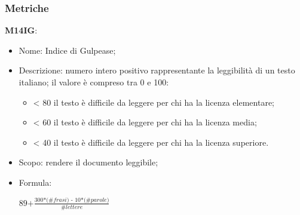 \subsubsection{Metriche}
\textbf{M14IG}:
    \begin{itemize}
      \item Nome: Indice di Gulpease;
      \item Descrizione: numero intero positivo rappresentante la leggibilità di un testo italiano; il valore è compreso tra 0 e 100:
           \begin{itemize}
                \item < 80 il testo è difficile da leggere per chi ha la licenza elementare;
                \item < 60 il testo è difficile da leggere per chi ha la licenza media;
                \item < 40 il testo è difficile da leggere per chi ha la licenza superiore.
           \end{itemize}
      \item Scopo: rendere il documento leggibile;
      \item Formula:
      \begin{center}
        $ \textit{89+}\frac{\textit{300*(\#frasi) - 10*(\#parole)}}{\textit{\#lettere}}$
      \end{center}
\end{itemize}